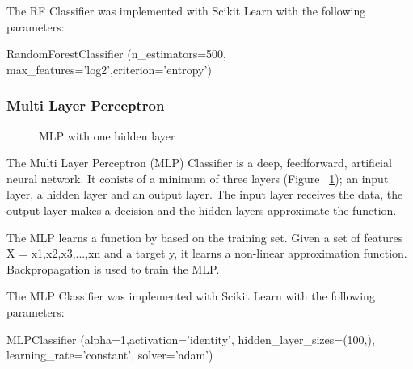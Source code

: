 The RF Classifier was implemented with Scikit Learn with the following parameters:

\begin{tcolorbox}
\begin{center}
	RandomForestClassifier (n\_estimators=500, max\_features='log2',criterion='entropy')
\end{center}
\end{tcolorbox}

\subsubsection*{Multi Layer Perceptron}

\begin{figure}[h!]
\centering
{}
\caption{\label{fig:mlp} MLP with one hidden layer \cite{scikit-learn}}
\end{figure}

The Multi Layer Perceptron (MLP) Classifier is a deep, feedforward, artificial neural network. It conists of a minimum of three layers (Figure ~\ref{fig:mlp}); an input layer, a hidden layer and an output layer. The input layer receives the data, the output layer makes a decision and the hidden layers approximate the function.

The MLP learns a function by based on the training set. Given a set of features X = x1,x2,x3,...,xn and a target y, it learns a non-linear approximation function. Backpropagation is used to train the MLP.

The MLP Classifier was implemented with Scikit Learn with the following parameters:

\begin{tcolorbox}
\begin{center}
	MLPClassifier (alpha=1,activation='identity', hidden\_layer\_sizes=(100,), learning\_rate='constant', solver='adam')
\end{center}
\end{tcolorbox}

